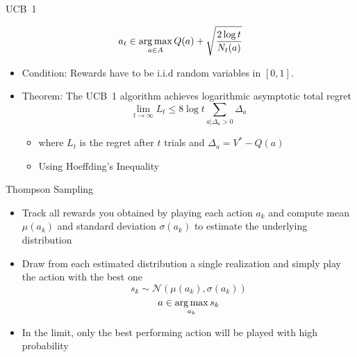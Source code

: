 \begin{frame}[c]{UCB~1}
	
			$$a_t \in \operatorname*{arg\,max}_{a \in A} Q(a) + \sqrt{\frac{2\log t }{N_t(a)}} $$
	
	\begin{itemize}

		\item Condition: Rewards have to be i.i.d random variables in $[0,1]$.
		\pause
		\item Theorem: The UCB~1 algorithm achieves logarithmic asymptotic total regret
		$$\lim_{t\to \infty} L_t \leq 8 \log t \sum_{a|\Delta_a>0} \Delta_a $$
		\begin{itemize}
			\item where $L_t$ is the regret after $t$ trials and $\Delta_a = V^* - Q(a)$
			\item Using Hoeffding's Inequality
		\end{itemize}
	\end{itemize}
	
\end{frame}
\begin{frame}[c]{Thompson Sampling}
	
	\begin{itemize}
		\item Track all rewards you obtained by playing each action $a_k$ and compute mean $\mu(a_k)$ and standard deviation $\sigma(a_k)$ to estimate the underlying distribution
		\item Draw from each estimated distribution a single realization and simply play the action with the best one
		$$ s_k \sim \mathcal{N}(\mu(a_k), \sigma(a_k))$$
		$$ a \in \operatorname*{arg\,max}_{a_k} s_k$$
		\item In the limit, only the best performing action will be played with high probability
	\end{itemize}
	
\end{frame}

